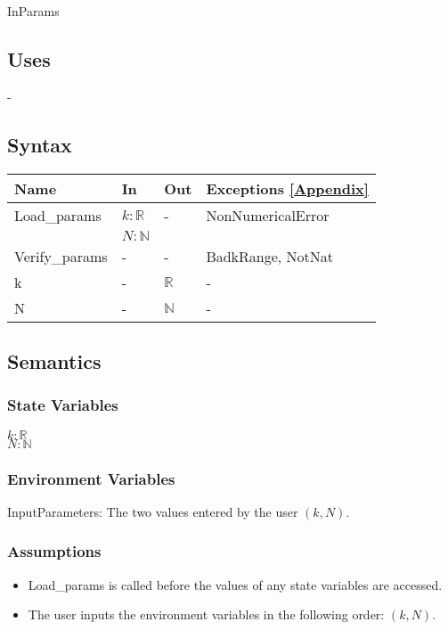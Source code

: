 \documentclass[12pt, titlepage]{article}
\begin{document}
InParams

\subsection{Uses}

-

\subsection{Syntax}

\begin{center}
\begin{tabular}{p{3cm} p{3cm} p{3cm} >{\raggedright\arraybackslash}p{7cm}}
\toprule
\textbf{Name} & \textbf{In} & \textbf{Out} & \textbf{Exceptions} \ref{Appendix} 
\\
\hline
Load\_params & $k : \mathbb{R}$ & - & NonNumericalError \\
& $N : \mathbb{N}$ &  &  \\
Verify\_params & - & - & BadkRange, NotNat \\
k & - & $\mathbb{R}$ & - \\
N & - & $\mathbb{N}$ & - \\
\hline
\end{tabular}
\end{center}

\subsection{Semantics}

\subsubsection{State Variables}

$k : \mathbb{R}$ \\ 
$N : \mathbb{N}$ 

\subsubsection{Environment Variables}

InputParameters: The two values entered by the user $(k,N)$. 

\subsubsection{Assumptions}

\begin{itemize}
	\item Load\_params is called before the values of any state variables are 
	accessed.
	\item The user inputs the environment variables in the following order: 
	$(k,N)$.
\end{itemize}
\end{document}
